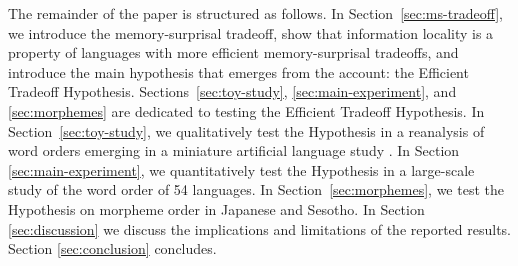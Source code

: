 The remainder of the paper is structured as follows. In Section~\ref{sec:ms-tradeoff}, we introduce the memory-surprisal tradeoff, show that information locality is a property of languages with more efficient memory-surprisal tradeoffs, and introduce the main hypothesis that emerges from the account: the Efficient Tradeoff Hypothesis. Sections~\ref{sec:toy-study}, \ref{sec:main-experiment}, and \ref{sec:morphemes} are dedicated to testing the Efficient Tradeoff Hypothesis. In Section~\ref{sec:toy-study}, we qualitatively test the Hypothesis in a reanalysis of word orders emerging in a miniature artificial language study \citep{fedzechkina-human-2017}.
In Section \ref{sec:main-experiment}, we quantitatively test the Hypothesis in a large-scale study of the word order of 54 languages. In Section~\ref{sec:morphemes}, we test the Hypothesis on morpheme order in Japanese and Sesotho.
In Section \ref{sec:discussion} we discuss the implications and limitations of the reported results.
Section \ref{sec:conclusion} concludes.






